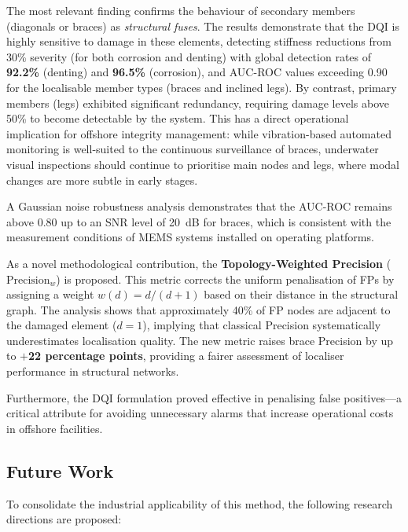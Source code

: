 \documentclass[a4paper,fleqn,nologo]{cas-dc}
\begin{document}
The most relevant finding confirms the behaviour of secondary members (diagonals or braces) as \emph{structural fuses}. The results demonstrate that the DQI is highly sensitive to damage in these elements, detecting stiffness reductions from 30\% severity (for both corrosion and denting) with global detection rates of \textbf{92.2\%} (denting) and \textbf{96.5\%} (corrosion), and AUC-ROC values exceeding 0.90 for the localisable member types (braces and inclined legs). By contrast, primary members (legs) exhibited significant redundancy, requiring damage levels above 50\% to become detectable by the system. This has a direct operational implication for offshore integrity management: while vibration-based automated monitoring is well-suited to the continuous surveillance of braces, underwater visual inspections should continue to prioritise main nodes and legs, where modal changes are more subtle in early stages.

A Gaussian noise robustness analysis demonstrates that the AUC-ROC remains above 0.80 up to an SNR level of 20~dB for braces, which is consistent with the measurement conditions of MEMS systems installed on operating platforms.

As a novel methodological contribution, the \textbf{Topology-Weighted Precision} ($\text{Precision}_w$) is proposed. This metric corrects the uniform penalisation of FPs by assigning a weight $w(d) = d/(d+1)$ based on their distance in the structural graph. The analysis shows that approximately 40\% of FP nodes are adjacent to the damaged element ($d = 1$), implying that classical Precision systematically underestimates localisation quality. The new metric raises brace Precision by up to \textbf{$+$22 percentage points}, providing a fairer assessment of localiser performance in structural networks.

Furthermore, the DQI formulation proved effective in penalising false positives---a critical attribute for avoiding unnecessary alarms that increase operational costs in offshore facilities.

\subsection{Future Work}

To consolidate the industrial applicability of this method, the following research directions are proposed:
\end{document}
